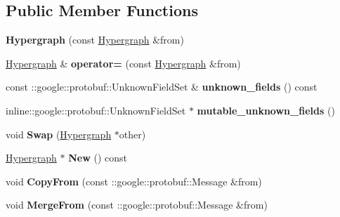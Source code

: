 \subsection*{Public Member Functions}
\begin{DoxyCompactItemize}
\item 
\hypertarget{classHypergraph_aa5b69fea3073cbbc6230c403aba60a13}{
{\bfseries Hypergraph} (const \hyperlink{classHypergraph}{Hypergraph} \&from)}
\label{classHypergraph_aa5b69fea3073cbbc6230c403aba60a13}

\item 
\hypertarget{classHypergraph_a6fa4366f554df3ffd7aa3694a3612006}{
\hyperlink{classHypergraph}{Hypergraph} \& {\bfseries operator=} (const \hyperlink{classHypergraph}{Hypergraph} \&from)}
\label{classHypergraph_a6fa4366f554df3ffd7aa3694a3612006}

\item 
\hypertarget{classHypergraph_a20ec2be2fda0e1db366f26c95817cd89}{
const ::google::protobuf::UnknownFieldSet \& {\bfseries unknown\_\-fields} () const }
\label{classHypergraph_a20ec2be2fda0e1db366f26c95817cd89}

\item 
\hypertarget{classHypergraph_a423987a46404cd3221a5c4035050b4b8}{
inline::google::protobuf::UnknownFieldSet $\ast$ {\bfseries mutable\_\-unknown\_\-fields} ()}
\label{classHypergraph_a423987a46404cd3221a5c4035050b4b8}

\item 
\hypertarget{classHypergraph_ac4a85460aabebe97e0411a30d80f720d}{
void {\bfseries Swap} (\hyperlink{classHypergraph}{Hypergraph} $\ast$other)}
\label{classHypergraph_ac4a85460aabebe97e0411a30d80f720d}

\item 
\hypertarget{classHypergraph_aed1ca8c3f4626f4313cd7e1b1ebf2676}{
\hyperlink{classHypergraph}{Hypergraph} $\ast$ {\bfseries New} () const }
\label{classHypergraph_aed1ca8c3f4626f4313cd7e1b1ebf2676}

\item 
\hypertarget{classHypergraph_a344289a1a02daaa7e9bb2284507bc25b}{
void {\bfseries CopyFrom} (const ::google::protobuf::Message \&from)}
\label{classHypergraph_a344289a1a02daaa7e9bb2284507bc25b}

\item 
\hypertarget{classHypergraph_a4aafea60a0bf75fe2c2f66172101110b}{
void {\bfseries MergeFrom} (const ::google::protobuf::Message \&from)}
\label{classHypergraph_a4aafea60a0bf75fe2c2f66172101110b}


\end{DoxyCompactItemize}
